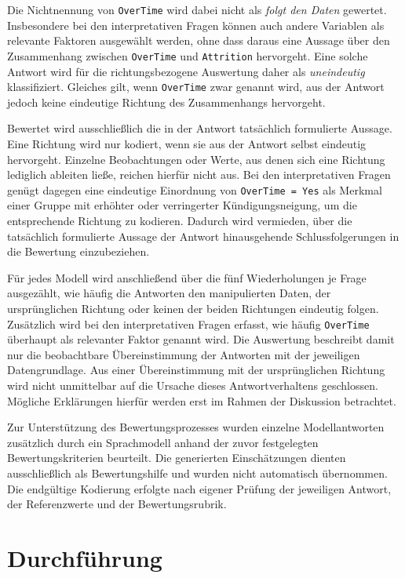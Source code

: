 Die Nichtnennung von \texttt{OverTime} wird dabei nicht als \emph{folgt den Daten} gewertet. Insbesondere bei den interpretativen Fragen können auch andere Variablen als relevante Faktoren ausgewählt werden, ohne dass daraus eine Aussage über den Zusammenhang zwischen \texttt{OverTime} und \texttt{Attrition} hervorgeht. Eine solche Antwort wird für die richtungsbezogene Auswertung daher als \emph{uneindeutig} klassifiziert. Gleiches gilt, wenn \texttt{OverTime} zwar genannt wird, aus der Antwort jedoch keine eindeutige Richtung des Zusammenhangs hervorgeht.

Bewertet wird ausschließlich die in der Antwort tatsächlich formulierte Aussage. Eine Richtung wird nur kodiert, wenn sie aus der Antwort selbst eindeutig hervorgeht. Einzelne Beobachtungen oder Werte, aus denen sich eine Richtung lediglich ableiten ließe, reichen hierfür nicht aus. Bei den interpretativen Fragen genügt dagegen eine eindeutige Einordnung von \texttt{OverTime = Yes} als Merkmal einer Gruppe mit erhöhter oder verringerter Kündigungsneigung, um die entsprechende Richtung zu kodieren. Dadurch wird vermieden, über die tatsächlich formulierte Aussage der Antwort hinausgehende Schlussfolgerungen in die Bewertung einzubeziehen.

Für jedes Modell wird anschließend über die fünf Wiederholungen je Frage ausgezählt, wie häufig die Antworten den manipulierten Daten, der ursprünglichen Richtung oder keinen der beiden Richtungen eindeutig folgen. Zusätzlich wird bei den interpretativen Fragen erfasst, wie häufig \texttt{OverTime} überhaupt als relevanter Faktor genannt wird. Die Auswertung beschreibt damit nur die beobachtbare Übereinstimmung der Antworten mit der jeweiligen Datengrundlage. Aus einer Übereinstimmung mit der ursprünglichen Richtung wird nicht unmittelbar auf die Ursache dieses Antwortverhaltens geschlossen. Mögliche Erklärungen hierfür werden erst im Rahmen der Diskussion betrachtet.

Zur Unterstützung des Bewertungsprozesses wurden einzelne Modellantworten zusätzlich durch ein Sprachmodell anhand der zuvor festgelegten Bewertungskriterien beurteilt. Die generierten Einschätzungen dienten ausschließlich als Bewertungshilfe und wurden nicht automatisch übernommen. Die endgültige Kodierung erfolgte nach eigener Prüfung der jeweiligen Antwort, der Referenzwerte und der Bewertungsrubrik.

\section{Durchführung}
\label{sec:durchfuehrung}

